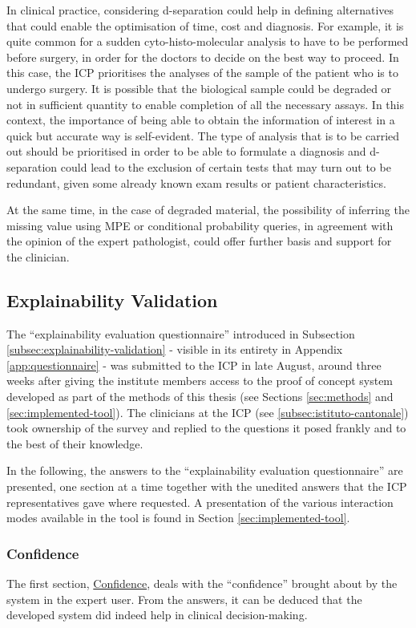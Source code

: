 In clinical practice, considering d-separation could help in defining alternatives that could enable the optimisation of time, cost and diagnosis. 
For example, it is quite common for a sudden cyto-histo-molecular analysis to have to be performed before surgery, in order for the doctors to decide on the best way to proceed.
 In this case, the ICP prioritises the analyses of the sample of the patient who is to undergo surgery. 
 It is possible that the biological sample could be degraded or not in sufficient quantity to enable completion of all the necessary assays. 
 In this context, the importance of being able to obtain the information of interest in a quick but accurate way is self-evident.
The type of analysis that is to be carried out should be prioritised in order to be able to formulate a diagnosis and d-separation could lead to the exclusion of certain tests that may turn out to be redundant, given some already known exam results or patient characteristics.

At the same time, in the case of degraded material, the possibility of inferring the missing value using MPE or conditional probability queries, in agreement with the opinion of the expert pathologist, could offer further basis and support for the clinician.

\subsection{Explainability Validation} \label{subsec:explainability-validation-results}
The \enquote{explainability evaluation questionnaire} introduced in Subsection \ref{subsec:explainability-validation} - visible in its entirety in Appendix \ref{app:questionnaire} - was submitted to the ICP in late August, around three weeks after giving the institute members access to the proof of concept system developed as part of the methods of this thesis (see Sections \ref{sec:methods} and \ref{sec:implemented-tool}).
The clinicians at the ICP (see \ref{subsec:istituto-cantonale}) took ownership of the survey and replied to the questions it posed frankly and to the best of their knowledge.

In the following, the answers to the \enquote{explainability evaluation questionnaire} are presented, one section at a time together with the unedited answers that the ICP representatives gave where requested.
A presentation of the various interaction modes available in the tool is found in Section \ref{sec:implemented-tool}.

\subsubsection{Confidence}
The first section, \hyperref[ques:confidence]{Confidence}, deals with the \enquote{confidence} brought about by the system in the expert user.
From the answers, it can be deduced that the developed system did indeed help in clinical decision-making.


